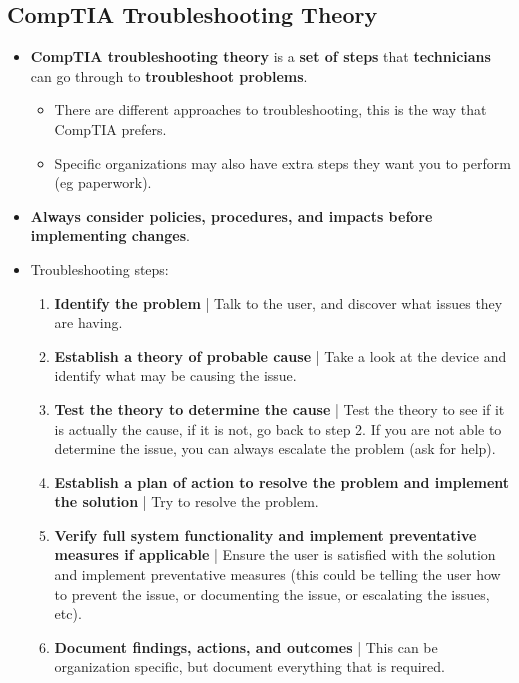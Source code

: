 \documentclass{article}
\begin{document}
    \subsection*{CompTIA Troubleshooting Theory}
    \begin{itemize}
        \item \textbf{CompTIA troubleshooting theory} is a \textbf{set of steps} that \textbf{technicians} can go through to \textbf{troubleshoot problems}.
        \begin{itemize}
            \item There are different approaches to troubleshooting, this is the way that CompTIA prefers.
            \item Specific organizations may also have extra steps they want you to perform (eg paperwork).
        \end{itemize}
        \item \textbf{Always consider policies, procedures, and impacts before implementing changes}.
        \item Troubleshooting steps:
        \begin{enumerate}
            \item \textbf{Identify the problem} | Talk to the user, and discover what issues they are having.
            \item \textbf{Establish a theory of probable cause} | Take a look at the device and identify what may be causing the issue.
            \item \textbf{Test the theory to determine the cause} | Test the theory to see if it is actually the cause, if it is not, go back to step 2. If you are not able to determine the issue, you can always escalate the problem (ask for help).
            \item \textbf{Establish a plan of action to resolve the problem and implement the solution} | Try to resolve the problem.
            \item \textbf{Verify full system functionality and implement preventative measures if applicable} | Ensure the user is satisfied with the solution and implement preventative measures (this could be telling the user how to prevent the issue, or documenting the issue, or escalating the issues, etc).
            \item \textbf{Document findings, actions, and outcomes} | This can be organization specific, but document everything that is required.
        \end{enumerate}
    \end{itemize}
\end{document}

